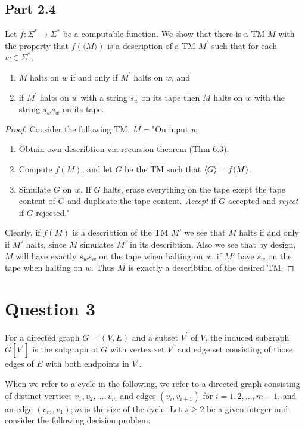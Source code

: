 \documentclass[a4paper,11pt]{article}
\numberwithin{equation}{section}
\begin{document}
	\subsection*{Part 2.4}
	Let $f: \Sigma^{*} \rightarrow \Sigma^{*}$ be a computable function. We show that there is a TM $M$ with the property that $f(\langle M\rangle)$ is a description of a TM $M^{\prime}$ such that for each $w \in \Sigma^{*}$,
	
	\begin{enumerate}
		\item $M$ halts on $w$ if and only if $M^{\prime}$ halts on $w$, and
		\item if $M^{\prime}$ halts on $w$ with a string $s_{w}$ on its tape then $M$ halts on $w$ with the string $s_{w} s_{w}$ on its tape.
	\end{enumerate}
\begin{proof}
	Consider the following TM, $ M= $"On input $ w $\begin{enumerate}
		\item Obtain own describtion via recursion theorem (Thm 6.3).
		\item Compute $ f(M) $, and let $ G $ be the TM such that $ \braket{G}=f(M) $.
		\item Simulate $ G $ on $ w $. If $ G $ halts, erase everything on the tape exept the tape content of $ G $ and duplicate the tape content. \emph{Accept} if $ G $ accepted and \emph{reject} if $ G $ rejected."
	\end{enumerate}
	Clearly, if $ f(M) $ is a describtion of the TM $ M' $ we see that $ M $ halts if and only if $ M' $ halts, since $ M $ simulates $ M' $ in its describtion. Also we see that by design, $ M $ will have exactly $ s_ws_w $ on the tape when halting on $ w $, if $ M' $ have $ s_w $ on the tape when halting on $ w $. Thus $ M $ is exactly a describtion of the desired TM.
\end{proof}
	\section*{Question 3}
	For a directed graph $G=(V, E)$ and a subset $V^{\prime}$ of $V$, the induced subgraph $G\left[V^{\prime}\right]$ is the subgraph of $G$ with vertex set $V^{\prime}$ and edge set consisting of those edges of $E$ with both endpoints in $V^{\prime}$.
	
	When we refer to a cycle in the following, we refer to a directed graph consisting of distinct vertices $v_{1}, v_{2}, \ldots, v_{m}$ and edges $\left(v_{i}, v_{i+1}\right)$ for $i=1,2, \ldots, m-1$, and an edge $\left(v_{m}, v_{1}\right) ; m$ is the size of the cycle. Let $s \geq 2$ be a given integer and consider the following decision problem:
	
\end{document}
